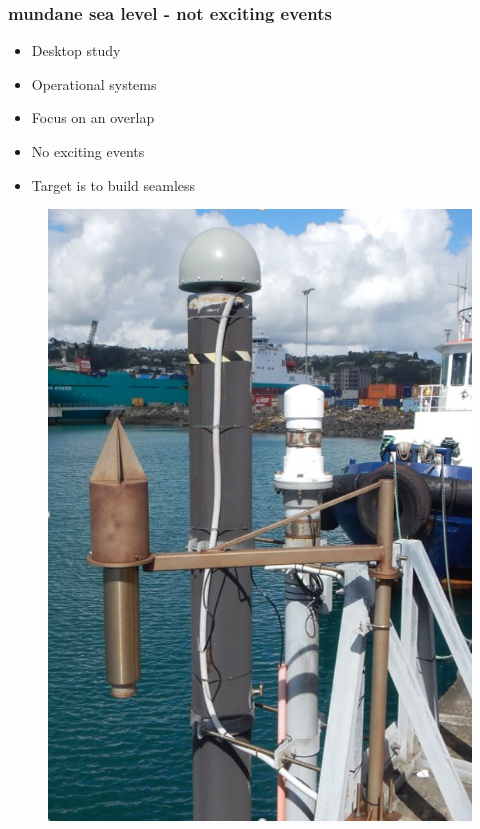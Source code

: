 \begin{frame}
\frametitle{mundane sea level - not exciting events}
\begin{minipage}{0.45\textwidth}
    \begin{itemize}
        \item Desktop study
        \item Operational systems
        \item Focus on an overlap
        \item No exciting events
        \item Target is to build seamless 
    \end{itemize}
\end{minipage}
\hfill
\begin{minipage}{0.45\textwidth}
    \begin{figure}      
    \includegraphics[width=\textwidth]{figures/images/tidegaugeEg.png}
    \end{figure}
\end{minipage}
\end{frame}
